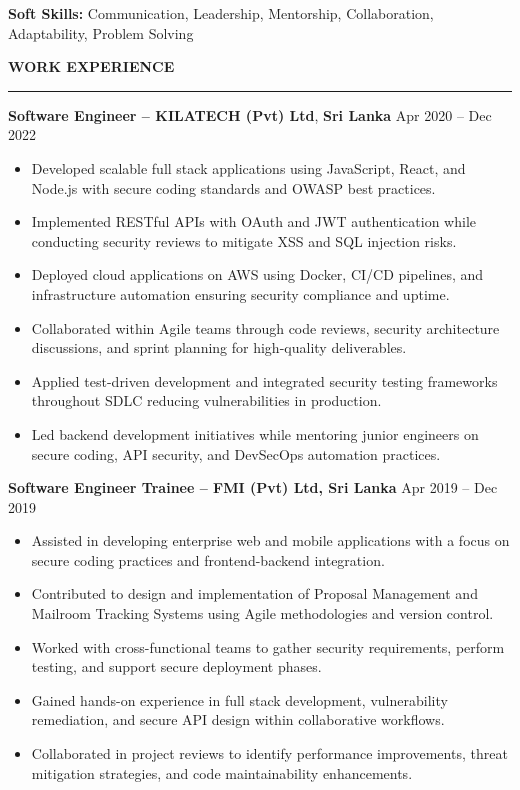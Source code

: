 \documentclass[10pt,letterpaper]{article}
\begin{document}
\textbf{Soft Skills:} Communication, Leadership, Mentorship, Collaboration, Adaptability, Problem Solving

\vspace{8pt}

\textbf{WORK EXPERIENCE}\\[-8pt]
\noindent\rule{\textwidth}{1pt}

\vspace{-2pt}

\textbf{Software Engineer -- KILATECH (Pvt) Ltd}, \textbf{Sri Lanka} \hfill Apr 2020 -- Dec 2022

\vspace{-1pt}

\begin{itemize}
\item Developed scalable full stack applications using JavaScript, React, and Node.js with secure coding standards and OWASP best practices.
\item Implemented RESTful APIs with OAuth and JWT authentication while conducting security reviews to mitigate XSS and SQL injection risks.
\item Deployed cloud applications on AWS using Docker, CI/CD pipelines, and infrastructure automation ensuring security compliance and uptime.
\item Collaborated within Agile teams through code reviews, security architecture discussions, and sprint planning for high-quality deliverables.
\item Applied test-driven development and integrated security testing frameworks throughout SDLC reducing vulnerabilities in production.
\item Led backend development initiatives while mentoring junior engineers on secure coding, API security, and DevSecOps automation practices.
\end{itemize}

\textbf{Software Engineer Trainee -- FMI (Pvt) Ltd, Sri Lanka} \hfill Apr 2019 -- Dec 2019

\vspace{-1pt}

\begin{itemize}
\item Assisted in developing enterprise web and mobile applications with a focus on secure coding practices and frontend-backend integration.
\item Contributed to design and implementation of Proposal Management and Mailroom Tracking Systems using Agile methodologies and version control.
\item Worked with cross-functional teams to gather security requirements, perform testing, and support secure deployment phases.
\item Gained hands-on experience in full stack development, vulnerability remediation, and secure API design within collaborative workflows.
\item Collaborated in project reviews to identify performance improvements, threat mitigation strategies, and code maintainability enhancements.
\end{itemize}
\end{document}

